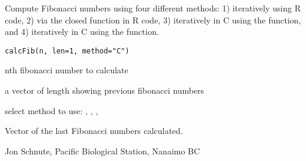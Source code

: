 \documentclass[letterpaper]{book}
\begin{document}
\begin{Description}\relax
Compute Fibonacci numbers using four different methods:
1) iteratively using R code,
2) via the closed function in R code,
3) iteratively in C using the  function,
and 4) iteratively in C using the  function.
\end{Description}
\begin{Usage}
\begin{verbatim}
calcFib(n, len=1, method="C")
\end{verbatim}
\end{Usage}
\begin{Arguments}
\begin{ldescription}
\item[\code{n}] nth fibonacci number to calculate
\item[\code{len}] a vector of length  showing previous fibonacci numbers
\item[\code{method}] select method to use: , , , 
\end{ldescription}
\end{Arguments}
\begin{Value}
Vector of the last  Fibonacci numbers 
calculated.
\end{Value}
\begin{Author}\relax
Jon Schnute, Pacific Biological Station, Nanaimo BC
\end{Author}
\end{document}
